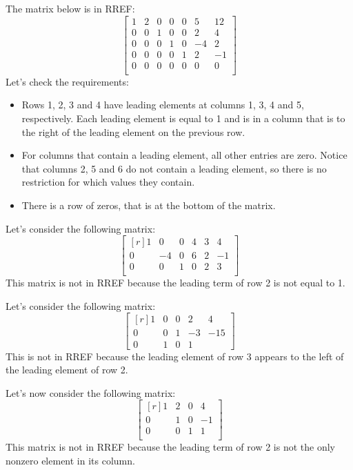 \documentclass[12pt]{article}
\begin{document}
\begin{example}
The matrix below is in RREF:
\[
\begin{bmatrix}
1 & 2 & 0 & 0 & 0 &  5 & 12\\
0 & 0 & 1 & 0 & 0 &  2 &  4\\
0 & 0 & 0 & 1 & 0 & -4 &  2\\
0 & 0 & 0 & 0 & 1 &  2 & -1\\
0 & 0 & 0 & 0 & 0 &  0 &  0\\ 
\end{bmatrix}
\]
Let's check the requirements:
\begin{itemize}
\item Rows 1, 2, 3 and 4 have leading elements at columns 1, 3, 4 and 5, respectively. Each leading element is equal to 1 and is in a column that is to the right of the leading element on the previous row.
\item For columns that contain a leading element, all other entries are zero. Notice that columns 2, 5 and 6 do not contain a leading element, so there is no restriction for which values they contain.
\item There is a row of zeros, that is at the bottom of the matrix.
\end{itemize}
\end{example}

\begin{example} Let's consider the following matrix:
\[
\begin{bmatrix*}[r]
1 &  0 & 0 & 4 & 3 &  4\\
0 & -4 & 0 & 6 & 2 & -1\\
0 &  0 & 1 & 0 & 2 &  3\\
\end{bmatrix*}
\]
This matrix is not in RREF because the leading term of row 2 is not equal to 1.
\end{example} 

\begin{example} Let's consider the following matrix:
\[
\begin{bmatrix*}[r]
1 & 0 & 0 &  2 &   4\\
0 & 0 & 1 & -3 & -15\\
0 & 1 & 0 &  1 & 
\end{bmatrix*}
\]
This is not in RREF because the leading element of row 3 appears to the left of the leading element of row 2.
\end{example}

\begin{example} Let's now consider the following matrix:
\[
\begin{bmatrix*}[r]
1 & 2 & 0 &  4\\
0 & 1 & 0 & -1\\
0 & 0 & 1 &  1\\ 
\end{bmatrix*}
\]
This matrix is not in RREF because the leading term of row 2 is not the only nonzero element in its column.
\end{example}
\end{document}
